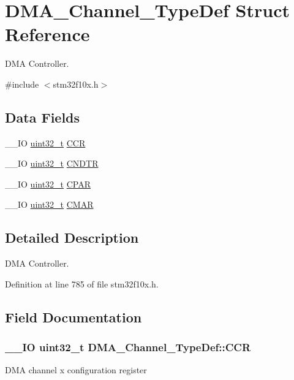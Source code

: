 \hypertarget{struct_d_m_a___channel___type_def}{\section{D\-M\-A\-\_\-\-Channel\-\_\-\-Type\-Def Struct Reference}
\label{struct_d_m_a___channel___type_def}
}


D\-M\-A Controller.  




{\ttfamily \#include $<$stm32f10x.\-h$>$}

\subsection*{Data Fields}
\begin{DoxyCompactItemize}
\item 
\-\_\-\-\_\-\-I\-O \hyperlink{stdint_8h_a435d1572bf3f880d55459d9805097f62}{uint32\-\_\-t} \hyperlink{struct_d_m_a___channel___type_def_aa4938d438293f76ff6d9a262715c23eb}{C\-C\-R}
\item 
\-\_\-\-\_\-\-I\-O \hyperlink{stdint_8h_a435d1572bf3f880d55459d9805097f62}{uint32\-\_\-t} \hyperlink{struct_d_m_a___channel___type_def_af1c675e412fb96e38b6b4630b88c5676}{C\-N\-D\-T\-R}
\item 
\-\_\-\-\_\-\-I\-O \hyperlink{stdint_8h_a435d1572bf3f880d55459d9805097f62}{uint32\-\_\-t} \hyperlink{struct_d_m_a___channel___type_def_a8ce1c9c2742eaaa0e97ddbb3a06154cc}{C\-P\-A\-R}
\item 
\-\_\-\-\_\-\-I\-O \hyperlink{stdint_8h_a435d1572bf3f880d55459d9805097f62}{uint32\-\_\-t} \hyperlink{struct_d_m_a___channel___type_def_a7a9886b5f9e0edaf5ced3d1870b33ad7}{C\-M\-A\-R}
\end{DoxyCompactItemize}


\subsection{Detailed Description}
D\-M\-A Controller. 

Definition at line 785 of file stm32f10x.\-h.



\subsection{Field Documentation}
\hypertarget{struct_d_m_a___channel___type_def_aa4938d438293f76ff6d9a262715c23eb}{
\subsubsection[{C\-C\-R}]{\setlength{\rightskip}{0pt plus 5cm}\-\_\-\-\_\-\-I\-O {\bf uint32\-\_\-t} D\-M\-A\-\_\-\-Channel\-\_\-\-Type\-Def\-::\-C\-C\-R}}\label{struct_d_m_a___channel___type_def_aa4938d438293f76ff6d9a262715c23eb}
D\-M\-A channel x configuration register 


